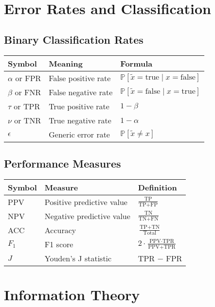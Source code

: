 \section{Error Rates and Classification}

\subsection{Binary Classification Rates}

\begin{tabular}{|l|l|l|}
\hline
\textbf{Symbol} & \textbf{Meaning} & \textbf{Formula} \\
\hline
$\alpha$ or FPR & False positive rate & $\mathbb{P}[\tilde{x} = \text{true} \mid x = \text{false}]$ \\
$\beta$ or FNR & False negative rate & $\mathbb{P}[\tilde{x} = \text{false} \mid x = \text{true}]$ \\
$\tau$ or TPR & True positive rate & $1 - \beta$ \\
$\nu$ or TNR & True negative rate & $1 - \alpha$ \\
$\epsilon$ & Generic error rate & $\mathbb{P}[\tilde{x} \neq x]$ \\
\hline
\end{tabular}

\subsection{Performance Measures}

\begin{tabular}{|l|l|l|}
\hline
\textbf{Symbol} & \textbf{Measure} & \textbf{Definition} \\
\hline
PPV & Positive predictive value & $\frac{\text{TP}}{\text{TP} + \text{FP}}$ \\
NPV & Negative predictive value & $\frac{\text{TN}}{\text{TN} + \text{FN}}$ \\
ACC & Accuracy & $\frac{\text{TP} + \text{TN}}{\text{Total}}$ \\
$F_1$ & F1 score & $2 \cdot \frac{\text{PPV} \cdot \text{TPR}}{\text{PPV} + \text{TPR}}$ \\
$J$ & Youden's J statistic & TPR $-$ FPR \\
\hline
\end{tabular}

\section{Information Theory}

